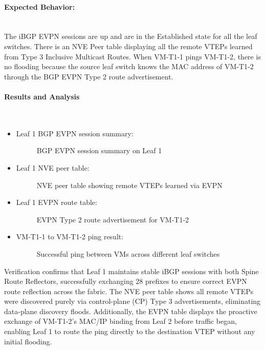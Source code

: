 \paragraph{Expected Behavior:}~\\
The iBGP EVPN sessions are up and are in the Established state for all the leaf switches. There is an NVE Peer table displaying all the remote VTEPs learned from Type 3 Inclusive Multicast Routes. When VM-T1-1 pings VM-T1-2, there is no flooding because the source leaf switch knows the MAC address of VM-T1-2 through the BGP EVPN Type 2 route advertisement.

\paragraph{Results and Analysis}~\\
\begin{itemize}
    \item []Leaf 1 BGP EVPN session summary:
    \begin{figure}[!htbp]
        \centering
        \EvpnLeaf
        \caption{BGP EVPN session summary on Leaf 1}
        \label{fig:evpn-leaf-summary}
    \end{figure}
    \item []Leaf 1 NVE peer table:
    \begin{figure}[!htbp]
        \centering
        \nvepeers
        \caption{NVE peer table showing remote VTEPs learned via EVPN}
        \label{fig:nve-peers}
    \end{figure}
    \item []Leaf 1 EVPN route table:
    \begin{figure}[!htbp]
        \centering
        \EVPNroute
        \caption{EVPN Type 2 route advertisement for VM-T1-2}
        \label{fig:evpn-route}
    \end{figure}
    \item []VM-T1-1 to VM-T1-2 ping result:
    \begin{figure}[!htbp]
        \centering
        \crosssite
        \caption{Successful ping between VMs across different leaf switches}
        \label{fig:cross-site-ping}
    \end{figure}
\end{itemize}
Verification confirms that Leaf 1 maintains stable iBGP sessions with both Spine Route Reflectors, successfully exchanging 28 prefixes to ensure correct EVPN route reflection across the fabric. The NVE peer table shows all remote VTEPs were discovered purely via control-plane (CP) Type 3 advertisements, eliminating data-plane discovery floods. Additionally, the EVPN table displays the proactive exchange of VM-T1-2's MAC/IP binding from Leaf 2 before traffic began, enabling Leaf 1 to route the ping directly to the destination VTEP without any initial flooding.
